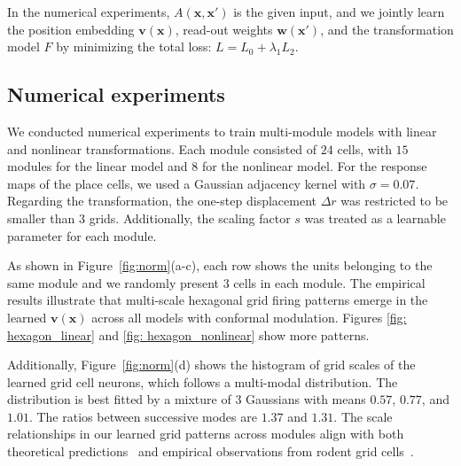 \documentclass{article}
\def\Figref#1{Figure~\ref{#1}}
\def\vv{{\bm{v}}}
\def\vw{{\bm{w}}}
\def\vx{{\bm{x}}}
\begin{document}
In the numerical experiments, $A(\vx, \vx')$ is the given input, and we jointly learn the position embedding $\vv(\vx)$, read-out weights $\vw(\vx')$, and the transformation model $F$ by minimizing the total loss: $L = L_0 + \lambda_1 L_2$.  

\subsection{Numerical experiments}
\label{sec:exp_multi}

We conducted numerical experiments to train multi-module models with linear and nonlinear transformations. Each module consisted of $24$ cells, with $15$ modules for the linear model and $8$ for the nonlinear model. For the response maps of the place cells, we used a Gaussian adjacency kernel with $\sigma=0.07$. Regarding the transformation, the one-step displacement $\Delta r$ was restricted to be smaller than $3$ grids. Additionally, the scaling factor $s$ was treated as a learnable parameter for each module.

As shown in \Figref{fig:norm}(a-c), each row shows the units belonging to the same module and we randomly present 3 cells in each module. The empirical results illustrate that multi-scale  hexagonal grid firing patterns emerge in the learned \( \vv(\vx) \) across all models with conformal modulation. Figures \ref{fig: hexagon_linear} and \ref{fig: hexagon_nonlinear} show more patterns.

Additionally, \Figref{fig:norm}(d) shows the histogram of grid scales of the learned grid cell neurons, which follows a multi-modal distribution. The distribution is best fitted by a mixture of 3 Gaussians with means  $0.57$, $0.77$, and $1.01$. The ratios between successive modes are $1.37$ and $1.31$. The scale relationships in our learned grid patterns across modules align with both theoretical predictions~\citep{stemmler2015connecting, Wei2015} and empirical observations from rodent
grid cells~\citep{stensola2012entorhinal}. 
\end{document}

